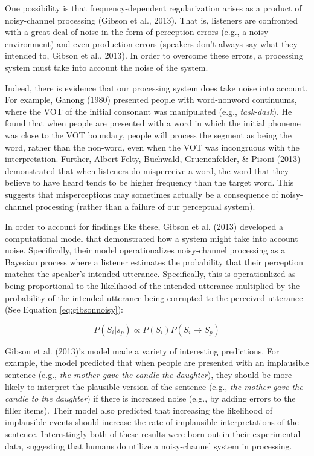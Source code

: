 \documentclass[10pt, letterpaper]{article}
\begin{document}
One possibility is that frequency-dependent regularization arises as a
product of noisy-channel processing (Gibson et al., 2013). That is,
listeners are confronted with a great deal of noise in the form of
perception errors (e.g., a noisy environment) and even production errors
(speakers don't always say what they intended to, Gibson et al., 2013).
In order to overcome these errors, a processing system must take into
account the noise of the system.

Indeed, there is evidence that our processing system does take noise
into account. For example, Ganong (1980) presented people with
word-nonword continuums, where the VOT of the initial consonant was
manipulated (e.g., \emph{task}-\emph{dask}). He found that when people
are presented with a word in which the initial phoneme was close to the
VOT boundary, people will process the segment as being the word, rather
than the non-word, even when the VOT was incongruous with the
interpretation. Further, Albert Felty, Buchwald, Gruenenfelder, \&
Pisoni (2013) demonstrated that when listeners do misperceive a word,
the word that they believe to have heard tends to be higher frequency
than the target word. This suggests that misperceptions may sometimes
actually be a consequence of noisy-channel processing (rather than a
failure of our perceptual system).

In order to account for findings like these, Gibson et al. (2013)
developed a computational model that demonstrated how a system might
take into account noise. Specifically, their model operationalizes
noisy-channel processing as a Bayesian process where a listener
estimates the probability that their perception matches the speaker's
intended utterance. Specifically, this is operationlized as being
proportional to the likelihood of the intended utterance multiplied by
the probability of the intended utterance being corrupted to the
perceived utterance (See Equation \ref{eq:gibsonnoisy}):

\begin{equation}
\label{eq:gibsonnoisy}
P(S_i|s_p) \propto P(S_i) P(S_i \to S_p)
\end{equation}

Gibson et al. (2013)'s model made a variety of interesting predictions.
For example, the model predicted that when people are presented with an
implausible sentence (e.g., \emph{the mother gave the candle the
daughter}), they should be more likely to interpret the plausible
version of the sentence (e.g., \emph{the mother gave the candle to the
daughter}) if there is increased noise (e.g., by adding errors to the
filler items). Their model also predicted that increasing the likelihood
of implausible events should increase the rate of implausible
interpretations of the sentence. Interestingly both of these results
were born out in their experimental data, suggesting that humans do
utilize a noisy-channel system in processing.
\end{document}
